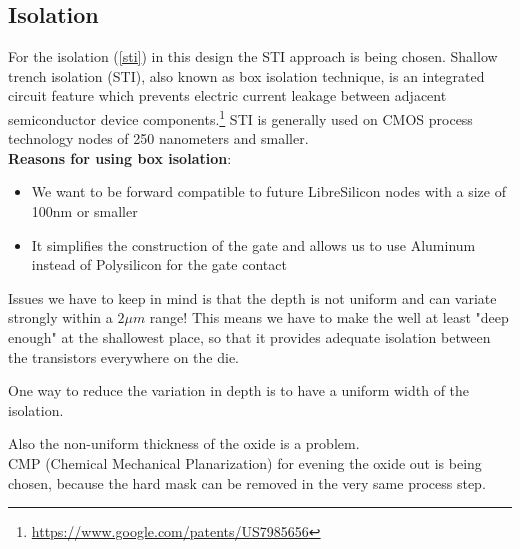 \subsection{Isolation}
For the isolation (\autoref{sti})  in this design the STI approach is being chosen.
Shallow trench isolation (STI), also known as box isolation technique, is an integrated circuit feature which prevents electric current leakage between adjacent semiconductor device components.\footnote{\url{https://www.google.com/patents/US7985656}}
STI is generally used on CMOS process technology nodes of 250 nanometers and smaller.\\

\textbf{Reasons for using box isolation}:\begin{itemize}
\item We want to be forward compatible to future LibreSilicon nodes with a size of 100nm or smaller
\item It simplifies the construction of the gate and allows us to use Aluminum instead of Polysilicon for the gate contact
\end{itemize}

Issues we have to keep in mind is that the depth is not uniform and can variate strongly within a $2 \mu m$ range!
This means we have to make the well at least "deep enough" at the shallowest place, so that it provides adequate isolation between the transistors everywhere on the die.

One way to reduce the variation in depth is to have a uniform width of the isolation.

Also the non-uniform thickness of the oxide is a problem. \\

CMP (Chemical Mechanical Planarization) for evening the oxide out is being chosen, because the hard mask can be removed in the very same process step.